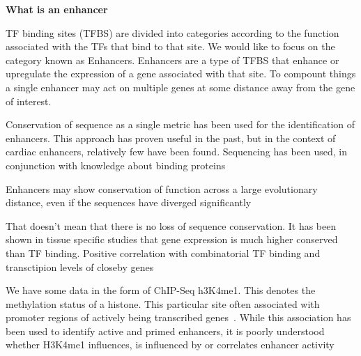         \textbf{What is an enhancer}
        
        TF binding sites (TFBS) are divided into categories according to the function associated with the TFs that bind to that site.
        We would like to focus on the category known as Enhancers. Enhancers are a type of TFBS that enhance or upregulate the 
        expression of a gene associated with that site.
        To compount things a single enhancer may act on multiple genes at some distance away from the gene of interest. 


        
        
        Conservation of sequence as a single metric has been used for the identification of enhancers. This approach has proven useful in the past, but in the context of cardiac enhancers, relatively few have been found. Sequencing has been used, in conjunction with knowledge about binding proteins~\cite{blow2010chip}
        
        Enhancers may show conservation of function across a large evolutionary distance, even if the sequences have diverged significantly~\cite{tautz2000evolution}
        
        That doesn't mean that there is no loss of sequence conservation. It has been shown in tissue specific studies that gene expression is much higher conserved than TF binding. Positive correlation with combinatorial TF binding and transctipion levels of closeby genes~\cite{wong2014decoupling}
        
        We have some data in the form of ChIP-Seq h3K4me1. This denotes the methylation status of a histone. This particular site often associated with promoter regions of actively being transcribed genes~\cite{barski2007high}. 
        While this association has been used to identify active and primed enhancers, it is poorly understood whether H3K4me1 influences, is influenced by or correlates enhancer activity~\cite{rada2018h3k4me1}
        
